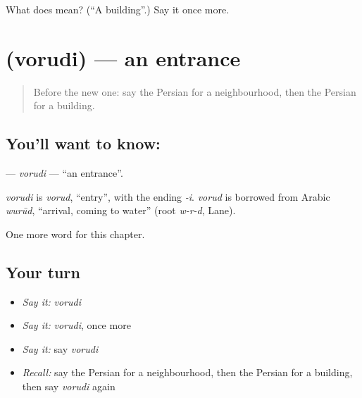 \begin{tcolorbox}[breakable,colback=teal!4,colframe=teal!35!black,title={Before you move on}]
What does  mean? (\textquotedblleft{}A building\textquotedblright{}.) Say it once more.
\end{tcolorbox}
\section[\texorpdfstring{\fa{ورودی} (vorudi)}{ورودی (vorudi)}]{ (vorudi) — an entrance}

\label{lesson:FA-C266-vorudi}



\begin{quote}
Before the new one: say the Persian for a neighbourhood, then the Persian for a building.
\end{quote}

\subsection*{You'll want to know: }
\textbf{} — \emph{vorudi} — \textquotedblleft{}an entrance\textquotedblright{}.

\begin{cousinweb}
\emph{vorudi} is \emph{vorud}, \textquotedblleft{}entry\textquotedblright{}, with the ending \emph{-i}. \emph{vorud} is borrowed from Arabic \emph{wurūd}, \textquotedblleft{}arrival, coming to water\textquotedblright{} (root \emph{w-r-d}, Lane).
\end{cousinweb}

\begin{grammarlens}[title={What you've built}]
One more word for this chapter.
\end{grammarlens}

\subsection*{Your turn}
\begin{itemize}
\raggedright
  \item \emph{Say it:} \emph{vorudi}
  \item \emph{Say it:} \emph{vorudi}, once more
  \item \emph{Say it:} say \emph{vorudi}
  \item \emph{Recall:} say the Persian for a neighbourhood, then the Persian for a building, then say \emph{vorudi} again
\end{itemize}

